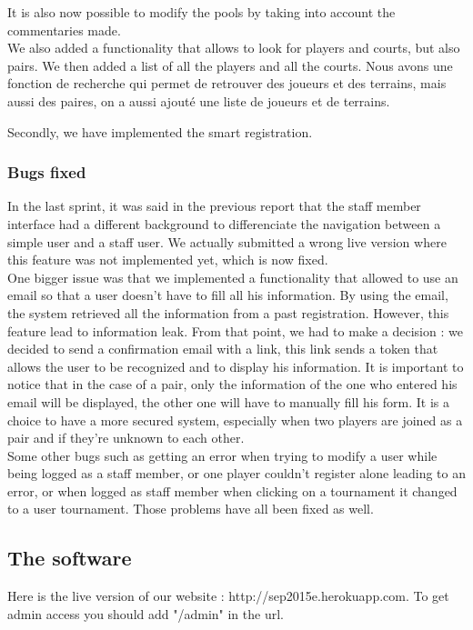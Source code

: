 \documentclass[a4paper, 12pt]{article}
\begin{document}
It is also now possible to modify the pools by taking into account the commentaries made.\\

We also added a functionality that allows to look for players and courts, but also pairs. We then added a list of all the players and all the courts.
Nous avons une fonction de recherche qui permet de retrouver des joueurs et des terrains, mais aussi des paires, on a aussi ajouté une liste de joueurs et de terrains. 

Secondly, we have implemented the smart registration. 
\subsubsection*{Bugs fixed}
In the last sprint, it was said in the previous report that the staff member interface had a different background to differenciate the navigation between a simple user and a staff user. We actually submitted a wrong live version where this feature was not implemented yet, which is now fixed.\\

One bigger issue was that we implemented a functionality that allowed to use an email so that a user doesn't have to fill all his information. By using the email, the system retrieved all the information from a past registration. However, this feature lead to information leak. From that point, we had to make a decision : we decided to send a confirmation email with a link, this link sends a token that allows the user to be recognized and to display his information. It is important to notice that in the case of a pair, only the information of the one who entered his email will be displayed, the other one will have to manually fill his form. It is a choice to have a more secured system, especially when two players are joined as a pair and if they're unknown to each other.\\

Some other bugs such as getting an error when trying to modify a user while being logged as a staff member, or one player couldn’t register alone leading to an error, or when logged as staff member when clicking on a tournament it changed to a user tournament. Those problems have all been fixed as well.

\subsection{The software}


Here is the live version of our website : http://sep2015e.herokuapp.com.  To get admin access you should add "/admin" in the url.\\
\end{document}
